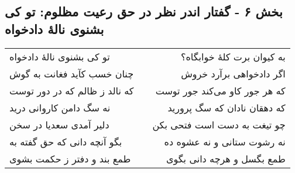 \begin{center}
\section*{بخش ۶ - گفتار اندر نظر در حق رعیت مظلوم: تو کی بشنوی نالهٔ دادخواه}
\label{sec:006}
\begin{longtable}{l p{0.5cm} r}
تو کی بشنوی نالهٔ دادخواه
&&
به کیوان برت کلهٔ خوابگاه؟
\\
چنان خسب کآید فغانت به گوش
&&
اگر دادخواهی برآرد خروش
\\
که نالد ز ظالم که در دور توست
&&
که هر جور کاو می‌کند جور توست
\\
نه سگ دامن کاروانی درید
&&
که دهقان نادان که سگ پرورید
\\
دلیر آمدی سعدیا در سخن
&&
چو تیغت به دست است فتحی بکن
\\
بگو آنچه دانی که حق گفته به
&&
نه رشوت ستانی و نه عشوه ده
\\
طمع بند و دفتر ز حکمت بشوی
&&
طمع بگسل و هرچه دانی بگوی
\\
\end{longtable}
\end{center}
